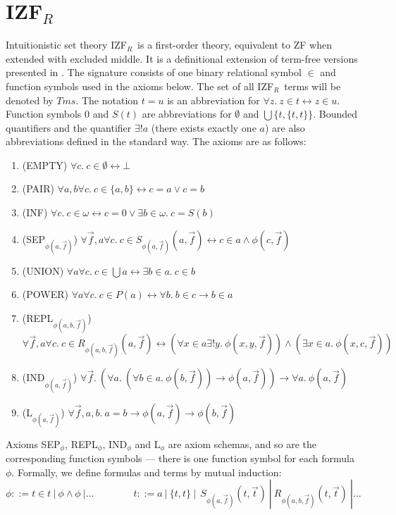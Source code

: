 \documentclass{LMCS}
\newcommand\iffl{\ensuremath{\leftrightarrow}}
\newcommand{\izfr}{IZF${}_R$}
\begin{document}
\section{\izfr}\label{izf}

Intuitionistic set theory \izfr\ is a first-order theory, equivalent to ZF
when extended with excluded middle. It is a definitional extension of
term-free versions presented in \cite{myhill72,beesonbook,frsce3}.
The signature consists of one binary relational symbol $\in$ and function symbols used in the axioms below.
The set of all \izfr\ terms will be denoted by $Tms$. The notation $t = u$ is an abbreviation for $\forall z.\ z \in t
\iffl z \in u$. Function symbols $0$ and $S(t)$ are abbreviations for
$\emptyset$ and $\bigcup \{ t, \{ t, t \} \}$. Bounded quantifiers and the quantifier $\exists !a$ (there exists exactly one $a$) are also abbreviations 
defined in the standard way. The axioms are as follows:

\begin{enumerate}[$\bullet$]
\item (EMPTY) $\forall c.\ c \in \emptyset \iffl \bot$
\item (PAIR) $\forall a, b \forall c.\ c \in \{ a, b \} \iffl c = a \lor
c = b$
\item (INF) $\forall c.\ c \in \omega \iffl c = 0 \lor \exists b \in \omega.\ c =
S(b)$
\item (SEP${}_{\phi(a, \vec{f})}$)
$\forall \vec{f}, a \forall
c.\ c \in S_{\phi(a, \vec{f})}(a, \vec{f}) \iffl c \in a \land
\phi(c, \vec{f})$
\item (UNION) $\forall a \forall c.\ c \in \bigcup a \iffl \exists b \in
a.\ c \in b$
\item (POWER) $\forall a \forall c.\ c \in P(a) \iffl \forall b.\ b \in c \to b \in a$
\item (REPL${}_{\phi(a, b, \vec{f})}$) $\forall \vec{f}, a
\forall c.\ c \in R_{\phi(a, b, \vec{f})}(a, \vec{f}) \iffl
(\forall x \in a \exists! y.\ \phi(x, y, \vec{f})) \land (\exists x \in
a.\ \phi(x, c, \vec{f}))$
\item (IND${}_{\phi(a, \vec{f})}$) $\forall \vec{f}.\ (\forall a.\ 
(\forall b \in a.\ \phi(b, \vec{f})) \to \phi(a, \vec{f})) \to \forall a.\ \phi(a, \vec{f})$
\item (L${}_{\phi(a, \vec{f})}$) $ \forall \vec{f}, a, b.\ a = b \to \phi(a, \vec{f}) \to \phi(b, \vec{f})$
\end{enumerate}

Axioms SEP${}_\phi$, REPL${}_\phi$, IND${}_\phi$ and L${}_\phi$ are axiom schemas, and
so are the corresponding function symbols ---
there is one function symbol for each formula $\phi$. Formally, we define formulas and terms by mutual induction:
\[
\phi ::= t \in t\ |\ \phi \land \phi\ | {\ldots} \qquad \qquad t ::= a\ |\ \{ t, t \}\ |\ \ S_{\phi(a, \vec{f})}(t, \vec{t})\ |\ R_{\phi(a,
b, \vec{f})}(t, \vec{t})\ | {\ldots} 
\]
\end{document}
